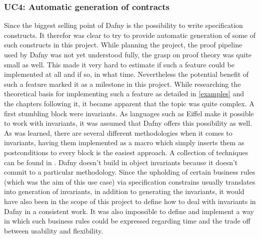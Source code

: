 \subsubsection{UC4: Automatic generation of contracts}\label{missinguc4}
Since the biggest selling point of Dafny is the possibility to write specification constructs. It therefor was clear to try to provide automatic generation of some of such constructs in this project. While planning the project, the proof pipeline used by Dafny was not yet understood fully, the grasp on proof theory was quite small as well. This made it very hard to estimate if such a feature could be implemented at all and if so, in what time. Nevertheless the potential benefit of such a feature marked it as a milestone in this project. \newline
While researching the theoretical basis for implementing such a feature as detailed in \ref{examples} and the chapters following it, it became apparent that the topic was quite complex. A first stumbling block were invariants. As languages such as Eiffel \cite{eiffel} make it possible to work with invariants, it was assumed that Dafny offers this possibility as well. \newline
As was learned, there are several different methodologies when it comes to invariants, having them implemented as a macro which simply inserts them as postconditions to every block is the easiest approach. A collection of techniques can be found in \cite{invariants}. 
Dafny doesn't build in object invariants because it doesn't commit to a particular methodology. Since the upholding of certain business rules (which was the aim of this use case) via specification constrains usually translates into generation of invariants, in addition to generating the invariants, it would have also been in the scope of this project to define how to deal with invariants in Dafny in a consistent work. It was also impossible to define and implement a way in which such business rules could be expressed regarding time and the trade off between usability and flexibility.\newline
